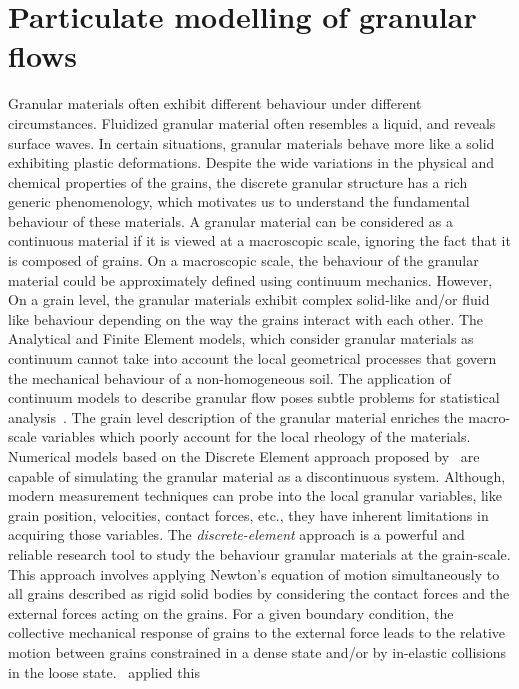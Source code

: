 \section{Particulate modelling of granular flows}

Granular materials often exhibit different behaviour under different 
circumstances. Fluidized granular material often resembles a liquid, and 
reveals surface waves. In certain situations, granular materials behave more 
like a solid exhibiting plastic deformations. Despite the wide variations in 
the physical and chemical properties of the grains, the discrete granular 
structure has a rich generic phenomenology, which motivates us to understand 
the fundamental behaviour of these materials. A granular material can be 
considered as a continuous material if it is viewed at a macroscopic scale, 
ignoring the fact that it is composed of grains. On a macroscopic scale, the 
behaviour of the granular material could be approximately defined using 
continuum mechanics. However, On a grain level, the granular materials 
exhibit complex solid-like and/or fluid like behaviour depending on the way the 
grains interact with each other. The Analytical and Finite Element models, 
which consider granular materials as continuum cannot take into account the 
local geometrical processes that govern the mechanical behaviour of a 
non-homogeneous soil. The application of continuum models to describe granular 
flow poses subtle problems for statistical analysis~\citep{mehta1994}. The 
grain level description of the granular material enriches the macro-scale 
variables which poorly account for the local rheology of the materials. 
Numerical models based on the Discrete Element approach proposed 
by~\citet{Cundall1979} are capable of simulating the granular material as a 
discontinuous system. Although, modern measurement techniques can probe into 
the local granular variables, like grain position, velocities, contact 
forces, etc., they have inherent limitations in acquiring those variables. The 
\textit{discrete-element} approach is a powerful and reliable research tool to 
study the behaviour granular materials at the grain-scale. This approach 
involves applying Newton's equation of motion simultaneously to all grains 
described as rigid solid bodies by considering the contact forces and the 
external forces acting on the grains. For a given boundary condition, the 
collective mechanical response of grains to the external force leads to the 
relative motion between grains constrained in a dense state and/or by 
in-elastic collisions in the loose state.~\citet{Cundall1979} applied this 
